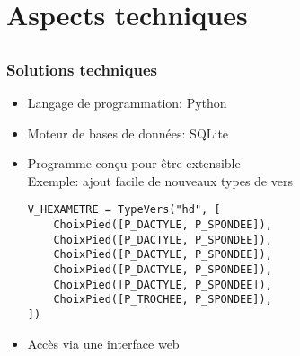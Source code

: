 \documentclass{beamer}
\begin{document}
\section{Aspects techniques}

\subsection*{}

\begin{frame}[fragile]
\frametitle{Solutions techniques}


\begin{itemize}
\item Langage de programmation: Python
\item Moteur de bases de données: SQLite

\vfill

\item Programme conçu pour être extensible\\
Exemple: ajout facile de nouveaux types de vers

{
\footnotesize
\begin{verbatim}
V_HEXAMETRE = TypeVers("hd", [
    ChoixPied([P_DACTYLE, P_SPONDEE]),
    ChoixPied([P_DACTYLE, P_SPONDEE]),
    ChoixPied([P_DACTYLE, P_SPONDEE]),
    ChoixPied([P_DACTYLE, P_SPONDEE]),
    ChoixPied([P_DACTYLE, P_SPONDEE]),
    ChoixPied([P_TROCHEE, P_SPONDEE]),
])
\end{verbatim}
}

\vfill

\item Accès via une interface web

\end{itemize}
\end{frame} 
\end{document}
